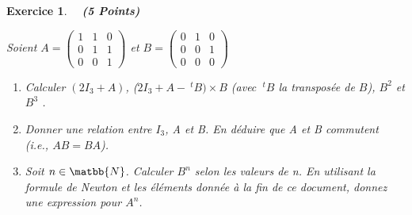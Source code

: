 \documentclass[12pt,fleqn]{report}
\newcommand{\hr}{\hrulefill}
\newtheorem{EX}{Exercice}
\newenvironment{exau}{\begin{EX} \normalfont}{\end{EX}}
\begin{document}
\begin{exau}
\ \hr \ \textbf{(5 Points)}

Soient 
$
A=\begin{pmatrix}
1&1&0\\ 0&1&1\\ 0&0&1
\end{pmatrix}
$ et $B = \begin{pmatrix} 0&1&0 \\ 0&0&1 \\ 0&0&0 \end{pmatrix} $
\begin{enumerate}
\item[${\rm a)}$] Calculer $(2I_3+A)$, ($2I_3+A - ~^tB)\times B$ (avec $~^tB$ la transposée de $B$), $B^2$ et $B^3$ . 
\item[${\rm b)}$] Donner une relation entre $I_3$, A et B. En déduire que A et B commutent (i.e., $AB=BA$).
\item[${\rm c)}$] Soit $n \in \matbb{N}$. Calculer $B^n$ selon les valeurs de n. En utilisant la formule de Newton et les éléments donnée à la fin de ce document, donnez une expression pour $A^n$.
\end{enumerate}
\end{exau}
\end{document}
